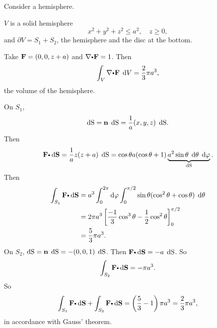 \begin{exa}
  Consider a hemisphere.
  \begin{center}
  \end{center}

  $V$ is a solid hemisphere
  \[
    x^2 + y^2 + z^2 \leq a^2, \quad z \geq 0,
  \]
  and $\partial V = S_1 + S_2$, the hemisphere and the disc at the bottom.

  Take $\mathbf{ F} = (0, 0, z + a)$ and $\nabla \bp \vector{F} = 1$. Then
  \[
    \dint_V\nabla \bp \vector{F}\;\d V = \dfrac{2}{3}\pi a^3,
  \]
  the volume of the hemisphere.

  On $S_1$,
  \[
    \d \S = \vector{n}\; \d \S= \dfrac{1}{a}(x, y, z)\;\d \S.
  \]
  Then
  \[
    \vector{F}\bp \d \vector{S} = \dfrac{1}{a}z(z + a)\; \d \S= \cos \theta a(\cos \theta + 1)\underbrace{a^2\sin \theta\;\d \theta\;\d \varphi}_{\d \S}.
  \]
  Then
  \begin{align*}
    \dint_{S_1}\vector{F}\bp \d \vector{S} &= a^3\dint_0^{2\pi}\d \varphi \dint_0^{\pi/2}\sin \theta(\cos^2\theta + \cos \theta)\;\d \theta\\
    &= 2\pi a^3 \left[\dfrac{-1}{3}\cos^3 \theta - \dfrac{1}{2}\cos^2 \theta\right]_0^{\pi/2}\\
    &= \dfrac{5}{3}\pi a^3.
  \end{align*}
  On $S_2$, $\d \S = \vector{n}\; \d \S= -(0, 0, 1)\;\d \S$. Then $\vector{F}\bp \d \vector{S} = -a\;\d \S$. So
  \[
    \dint_{S_2} \vector{F}\bp \d \vector{S} = -\pi a^3.
  \]
  So
  \[
    \dint_{S_1}\vector{F}\bp \d \vector{S} +\dint_{S_2}\vector{F}\bp \d \vector{S} = \left(\dfrac{5}{3} - 1\right)\pi a^3 = \dfrac{2}{3}\pi a^3,
  \]
  in accordance with Gauss' theorem.
\end{exa}








